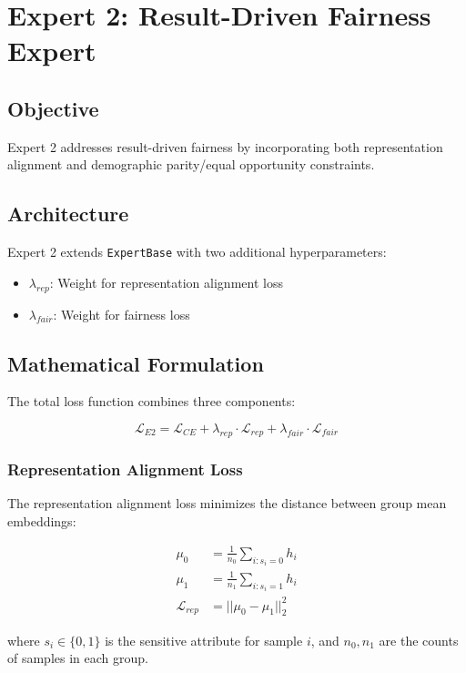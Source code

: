 \documentclass[11pt]{article}
\begin{document}
\section{Expert 2: Result-Driven Fairness Expert}

\subsection{Objective}
Expert 2 addresses result-driven fairness by incorporating both representation alignment and demographic parity/equal opportunity constraints.

\subsection{Architecture}
Expert 2 extends \texttt{ExpertBase} with two additional hyperparameters:
\begin{itemize}
    \item $\lambda_{rep}$: Weight for representation alignment loss
    \item $\lambda_{fair}$: Weight for fairness loss
\end{itemize}

\subsection{Mathematical Formulation}

The total loss function combines three components:

\begin{equation}
    \mathcal{L}_{E2} = \mathcal{L}_{CE} + \lambda_{rep} \cdot \mathcal{L}_{rep} + \lambda_{fair} \cdot \mathcal{L}_{fair}
\end{equation}

\subsubsection{Representation Alignment Loss}
The representation alignment loss minimizes the distance between group mean embeddings:

\begin{align}
    \mu_0 &= \frac{1}{n_0} \sum_{i: s_i = 0} h_i \\
    \mu_1 &= \frac{1}{n_1} \sum_{i: s_i = 1} h_i \\
    \mathcal{L}_{rep} &= ||\mu_0 - \mu_1||_2^2
\end{align}

where $s_i \in \{0,1\}$ is the sensitive attribute for sample $i$, and $n_0, n_1$ are the counts of samples in each group.
\end{document}

